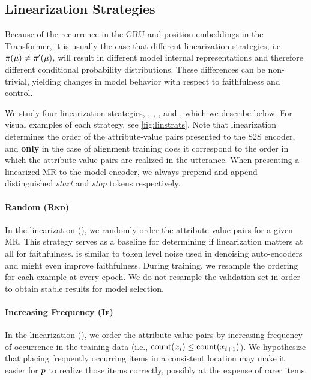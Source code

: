 \subsection{Linearization Strategies}
\label{sec:linstrats}

Because of the recurrence in the GRU and position embeddings in the
Transformer, it is usually the case that different linearization
strategies, i.e.  $\pi(\mu) \ne \pi^\prime(\mu)$, will result in different
model internal representations and therefore different conditional probability
distributions. These differences can be non-trivial, yielding changes in model
behavior with respect to faithfulness and control.

We study four linearization strategies, , , , and , which we describe below. For visual examples of each
strategy, see \autoref{fig:linstrats}.  Note that linearization determines the
order of the attribute-value pairs presented to the S2S encoder, and \textbf{only} in the
case of alignment training does it correspond to the order in which the
attribute-value pairs are realized in the utterance. When presenting a linearized
MR to the model encoder, we always prepend and append distinguished
\textit{start} and \textit{stop} tokens respectively.



\paragraph{Random (\textsc{Rnd})} In the  linearization
(), we randomly order the attribute-value pairs for a given MR.
This strategy serves as a baseline for determining if linearization 
matters at all for faithfulness.  is similar to token level noise
used in denoising auto-encoders \cite{wang2019} and might
even improve faithfulness.  During training, we resample the ordering for each
example at every epoch.  We do not resample the validation set in order to
obtain stable results for model selection.

\paragraph{Increasing Frequency (\textsc{If})} In the  linearization (), we order the attribute-value pairs by
increasing frequency of occurrence in the training data (i.e., $\operatorname{count}(x_i)
\le \operatorname{count}(x_{i+1})$).  We hypothesize that placing frequently occurring
items in a consistent location may make it easier for $p$ to realize
those items correctly, possibly at the expense of rarer items.

